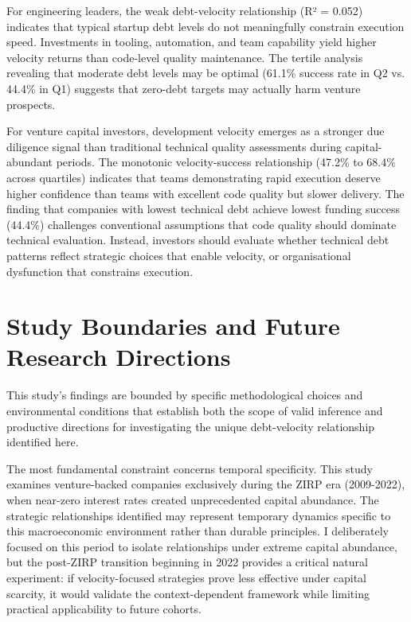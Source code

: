 For engineering leaders, the weak debt-velocity relationship (R² = 0.052) indicates that typical startup debt levels do not meaningfully constrain execution speed. Investments in tooling, automation, and team capability yield higher velocity returns than code-level quality maintenance. The tertile analysis revealing that moderate debt levels may be optimal (61.1\% success rate in Q2 vs. 44.4\% in Q1) suggests that zero-debt targets may actually harm venture prospects.

For venture capital investors, development velocity emerges as a stronger due diligence signal than traditional technical quality assessments during capital-abundant periods. The monotonic velocity-success relationship (47.2\% to 68.4\% across quartiles) indicates that teams demonstrating rapid execution deserve higher confidence than teams with excellent code quality but slower delivery. The finding that companies with lowest technical debt achieve lowest funding success (44.4\%) challenges conventional assumptions that code quality should dominate technical evaluation. Instead, investors should evaluate whether technical debt patterns reflect strategic choices that enable velocity, or organisational dysfunction that constrains execution.

\section{Study Boundaries and Future Research Directions}\label{subsec:boundaries}

This study's findings are bounded by specific methodological choices and environmental conditions that establish both the scope of valid inference and productive directions for investigating the unique debt-velocity relationship identified here.

The most fundamental constraint concerns temporal specificity. This study examines venture-backed companies exclusively during the \ac{ZIRP} era (2009-2022), when near-zero interest rates created unprecedented capital abundance. The strategic relationships identified may represent temporary dynamics specific to this macroeconomic environment rather than durable principles. I deliberately focused on this period to isolate relationships under extreme capital abundance, but the post-\ac{ZIRP} transition beginning in 2022 provides a critical natural experiment: if velocity-focused strategies prove less effective under capital scarcity, it would validate the context-dependent framework while limiting practical applicability to future cohorts.

